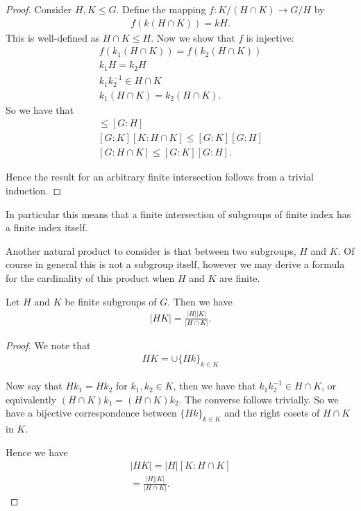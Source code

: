 \documentclass[]{article}
\begin{document}
\begin{proof}
		Consider $H, K \leq G$. Define the mapping $f: K / (H \cap K) \to G / H$ by 
		\begin{align*}
				f(k (H\cap K)) = kH.
		\end{align*}
		This is well-defined as $H\cap K \leq H$. Now we show that $f$ is injective:
		\begin{align*}
				f(k_1 (H \cap K)) = f(k_2 (H \cap K)) \\
				k_1 H = k_2 H \\
				k_1 k_2^{-1} \in H \cap K \\
				k_1 (H \cap K) = k_2 (H \cap K).
		\end{align*}
		So we have that 
		\begin{align*}
				[K : H \cap K] \leq [G : H] \\
				[G : K][K : H \cap K] \leq [G : K][G : H] \\
				[G : H \cap K] \leq [G : K][G : H].
		\end{align*}

		Hence the result for an arbitrary finite intersection follows from a trivial induction.
\end{proof}

In particular this means that a finite intersection of subgroups of finite index has a finite index itself. 

Another natural product to consider is that between two subgroups, $H$ and $K$. Of course in general this is not a subgroup itself, however we may derive a formula for the cardinality of this product when $H$ and $K$ are finite.

\begin{thm}
		Let $H$ and $K$ be finite subgroups of $G$. Then we have
		\begin{align*}
				|HK| = \frac{|H| |K|}{|H \cap K|}.
		\end{align*}
\end{thm}

\begin{proof}
		We note that 
		\begin{align*}
				HK = \cup \{Hk\}_{k\in K}
		\end{align*}

		Now say that $Hk_1 = Hk_2$ for $k_1, k_2 \in K$, then we have that $k_1k_2^{-1} \in H \cap K$, or equivalently $(H \cap K) k_1 = (H \cap K) k_2$. The converse follows trivially. So we have a bijective correspondence between $\{Hk\}_{k\in K}$ and the right cosets of  $H \cap K$ in $K$.

		Hence we have
		\begin{align*}
			|HK| = |H|[K : H\cap K] \\
			= \frac{|H| |K|}{|H \cap K|}.
		\end{align*}
\end{proof}
\end{document}
